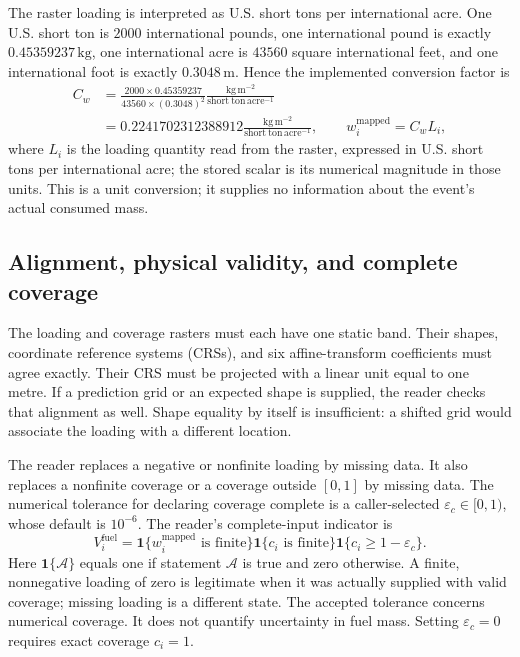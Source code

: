 \documentclass[11pt,a4paper]{article}
\newcommand{\Ind}{\mathbf{1}}
\begin{document}
The raster loading is interpreted as U.S. short tons per international acre.
One U.S. short ton is $2000$ international pounds, one international pound is
exactly $0.45359237\,\mathrm{kg}$, one international acre is
$43560$ square international feet, and one international foot is exactly
$0.3048\,\mathrm{m}$. Hence the implemented conversion factor is
\begin{align}
 C_w
 &=\frac{2000\times0.45359237}
          {43560\times(0.3048)^2}
   \frac{\mathrm{kg\,m^{-2}}}{\mathrm{short\ ton\,acre^{-1}}}
   \nonumber\\
 &=0.2241702312388912
   \frac{\mathrm{kg\,m^{-2}}}{\mathrm{short\ ton\,acre^{-1}}},
 \qquad
 w_i^{\mathrm{mapped}}=C_w L_i,
 \label{eq:fccs-si}
\end{align}
where $L_i$ is the loading quantity read from the raster, expressed in
U.S. short tons per international acre; the stored scalar is its numerical
magnitude in those units. This is a unit
conversion; it supplies no information about the event's actual consumed mass.

\subsection{Alignment, physical validity, and complete coverage}

The loading and coverage rasters must each have one static band. Their shapes,
coordinate reference systems (CRSs), and six affine-transform coefficients must
agree exactly. Their CRS must be projected with a linear unit equal to one
metre. If a prediction grid or an expected shape is supplied, the reader checks
that alignment as well. Shape equality by itself is insufficient: a shifted
grid would associate the loading with a different location.

The reader replaces a negative or nonfinite loading by missing data. It also
replaces a nonfinite coverage or a coverage outside $[0,1]$ by missing data.
The numerical tolerance for declaring coverage complete is a caller-selected
$\varepsilon_c\in[0,1)$, whose default is $10^{-6}$. The reader's complete-input
indicator is
\begin{equation}
 V_i^{\mathrm{fuel}}
 =\Ind\{w_i^{\mathrm{mapped}}\text{ is finite}\}
  \Ind\{c_i\text{ is finite}\}
  \Ind\{c_i\geq1-\varepsilon_c\}.
 \label{eq:fccs-complete}
\end{equation}
Here $\Ind\{\mathcal A\}$ equals one if statement $\mathcal A$ is true and zero
otherwise. A finite, nonnegative loading of zero is legitimate when it was
actually supplied with valid coverage; missing loading is a different state.
The accepted tolerance concerns numerical coverage. It does not quantify
uncertainty in fuel mass. Setting $\varepsilon_c=0$ requires exact coverage
$c_i=1$.
\end{document}
